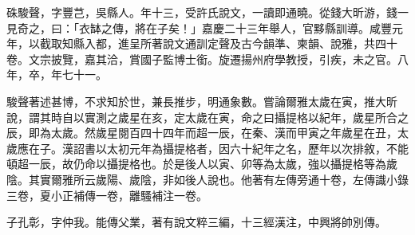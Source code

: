 \begin{pinyinscope}
硃駿聲，字豐芑，吳縣人。年十三，受許氏說文，一讀即通曉。從錢大昕游，錢一見奇之，曰：「衣缽之傳，將在子矣！」嘉慶二十三年舉人，官黟縣訓導。咸豐元年，以截取知縣入都，進呈所著說文通訓定聲及古今韻準、柬韻、說雅，共四十卷。文宗披覽，嘉其洽，賞國子監博士銜。旋遷揚州府學教授，引疾，未之官。八年，卒，年七十一。

駿聲著述甚博，不求知於世，兼長推步，明通象數。嘗論爾雅太歲在寅，推大昕說，謂其時自以實測之歲星在亥，定太歲在寅，命之曰攝提格以紀年，歲星所合之辰，即為太歲。然歲星閱百四十四年而超一辰，在秦、漢而甲寅之年歲星在丑，太歲應在子。漢詔書以太初元年為攝提格者，因六十紀年之名，歷年以次排敘，不能頓超一辰，故仍命以攝提格也。於是後人以寅、卯等為太歲，強以攝提格等為歲陰。其實爾雅所云歲陽、歲陰，非如後人說也。他著有左傳旁通十卷，左傳識小錄三卷，夏小正補傳一卷，離騷補注一卷。

子孔彰，字仲我。能傳父業，著有說文粹三編，十三經漢注，中興將帥別傳。


\end{pinyinscope}
